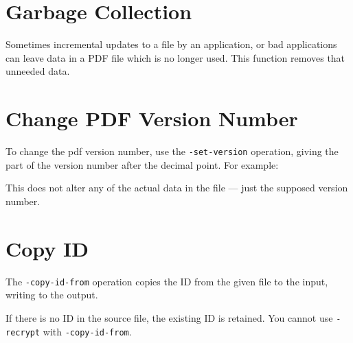 \documentclass{book}
\begin{document}
\noindent{}

  \section{Garbage Collection}
  Sometimes incremental updates to a file by an application, or bad
applications can leave data in a PDF file which is no longer used. This
function removes that unneeded data.

\noindent{}
 
  \section{Change PDF Version Number}
   \label{setversion}
   To change the pdf version number, use the \texttt{-set-version} operation,
giving the part of the version number after the decimal point. For example:

\noindent{} 
  \noindent This does not alter any of the actual data in the file ---
just the supposed version number.

  \section{Copy ID}
  The \texttt{-copy-id-from} operation copies the ID from the given file to the
input, writing to the output.

\noindent{}

  \noindent If there is no ID in the source file, the existing ID is retained. You cannot use \texttt{-recrypt} with \texttt{-copy-id-from}.
\end{document}
